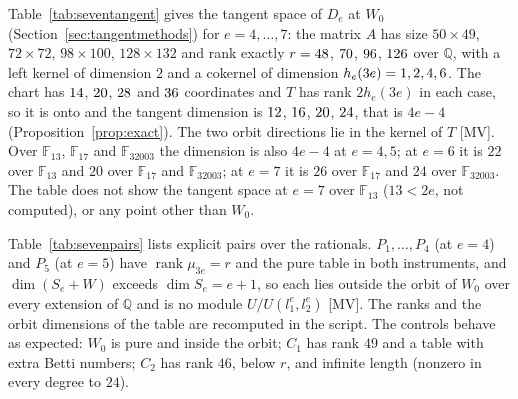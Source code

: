 \documentclass[11pt]{article}
\theoremstyle{definition}
\theoremstyle{remark}
\newcommand{\Q}{\mathbb{Q}}
\newcommand{\F}{\mathbb{F}}
\begin{document}
Table~\ref{tab:seventangent} gives the tangent space of $D_e$ at $W_0$ (Section~\ref{sec:tangentmethods}) for $e=4,\dots,7$: the matrix $A$ has size $50\times49$, $72\times72$, $98\times100$, $128\times132$ and rank exactly $r=48$, $70$, $96$, $126$ over $\Q$, with a left kernel of dimension $2$ and a cokernel of dimension $h_e(3e)=1,2,4,6$. The chart has $14$, $20$, $28$ and $36$ coordinates and $T$ has rank $2h_e(3e)$ in each case, so it is onto and the tangent dimension is $12$, $16$, $20$, $24$, that is $4e-4$ (Proposition~\ref{prop:exact}). The two orbit directions lie in the kernel of $T$ [MV]. Over $\F_{13}$, $\F_{17}$ and $\F_{32003}$ the dimension is also $4e-4$ at $e=4,5$; at $e=6$ it is $22$ over $\F_{13}$ and $20$ over $\F_{17}$ and $\F_{32003}$; at $e=7$ it is $26$ over $\F_{17}$ and $24$ over $\F_{32003}$. The table does not show the tangent space at $e=7$ over $\F_{13}$ ($13<2e$, not computed), or any point other than $W_0$.

\begin{table}[htbp]
\centering\footnotesize

\caption{The tangent space of $D_e$ at $W_0=\langle x^e,y^e\rangle$: the size of $A=\mu_{3e}(W_0)$, its rank $r$, the dimension $h_e(3e)$ of its cokernel, the number of chart coordinates $2(u(e)-2)$, the rank of $T$, the tangent dimension over $\Q$, the bound $4e-4$, and the tangent dimension over $\F_{13}$, $\F_{17}$ and $\F_{32003}$ (a dash where it was not computed).}
\label{tab:seventangent}
\end{table}

Table~\ref{tab:sevenpairs} lists explicit pairs over the rationals. $P_1,\dots,P_4$ (at $e=4$) and $P_5$ (at $e=5$) have $\operatorname{rank}\mu_{3e}=r$ and the pure table in both instruments, and $\dim(S_e+W)$ exceeds $\dim S_e=e+1$, so each lies outside the orbit of $W_0$ over every extension of $\Q$ and is no module $U/U(l_1^e,l_2^e)$ [MV]. The ranks and the orbit dimensions of the table are recomputed in the script. The controls behave as expected: $W_0$ is pure and inside the orbit; $C_1$ has rank $49$ and a table with extra Betti numbers; $C_2$ has rank $46$, below $r$, and infinite length (nonzero in every degree to $24$).

\begin{table}[htbp]
\centering\footnotesize

\caption{Explicit spaces over $\Q$ at $e=4,5$: the forms, the rank of $\mu_{3e}$ against $r$, the Betti table, and $\dim(S_e+W)$ against $\dim S_e=e+1$ (equal for a space inside the orbit); $P_1,\dots,P_5$ are pure and outside the orbit, $W_0$ is pure and inside, $C_1$ and $C_2$ are controls that are not pure.}
\label{tab:sevenpairs}
\end{table}
\end{document}
